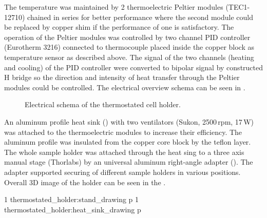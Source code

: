 The temperature was maintained by 2 thermoelectric Peltier modules (TEC1-12710)
chained in series for better performance where the second module could be
replaced by copper shim if the performance of one is satisfactory. The
operation of the Peltier modules was controlled by two channel PID controller
(Eurotherm 3216) connected to thermocouple placed inside the copper block as
temperature sensor as described above. The signal of the two channels (heating
and cooling) of the PID controller were converted to bipolar signal by
constructed H bridge so the direction and intensity of heat transfer through
the Peltier modules could be controlled. The electrical overview schema can be
seen in .

\begin{figure}
	\centering
	\LOWQUALITY
	
	\caption{Electrical schema of the thermostated cell holder.}
	\label{\figlabel{thermostated_holder:electrical_schema}}
\end{figure}

An aluminum profile heat sink
()
with two ventilators (Sukon, 2500\,rpm, 17\,W) was attached to the
thermoelectric modules to increase their efficiency. The aluminum profile was
insulated from the copper core block by the teflon layer. The whole sample
holder was attached through the heat sing to a three axis manual stage
(Thorlabs) by an universal aluminum right-angle adapter
().
The adapter supported securing of different sample holders in various
positions. Overall 3D image of the holder can be seen in the
.

%
{1}%
{thermostated_holder:stand_drawing}
{p}
%
{1}%
{thermostated_holder:heat_sink_drawing}
{p}

